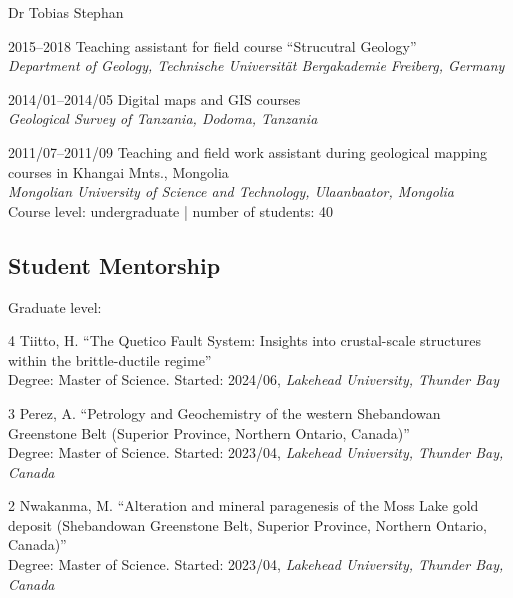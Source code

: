 \documentclass[10pt, paper=letter]{scrartcl} %
\begin{document}
\begin{cv}{\textsf{Dr Tobias Stephan}}
\begin{cvlist}{}
        \item[2015--2018] Teaching assistant for field course \enquote{Strucutral Geology}\\
        \textit{Department of Geology, Technische Universit\"at Bergakademie Freiberg, Germany}
        \item[2014/01--2014/05] Digital maps and GIS courses\\
        \textit{Geological Survey of Tanzania, Dodoma, Tanzania}
        \item[2011/07--2011/09] Teaching and field work assistant during geological mapping courses in Khangai Mnts., Mongolia\\
        \textit{Mongolian University of Science and Technology, Ulaanbaator, Mongolia}\\
        Course level: undergraduate | number of students: 40
    \end{cvlist}

    \subsection{Student Mentorship}
    \begin{cvlist}{Graduate level:}
        \item[4] Tiitto, H. \enquote{The Quetico Fault System: Insights into crustal-scale structures within the brittle-ductile regime}\\
        Degree: Master of Science. Started: 2024/06, \textit{Lakehead University, Thunder Bay}
        \item[3] Perez, A. \enquote{Petrology and Geochemistry of the western
            Shebandowan Greenstone Belt (Superior Province, Northern Ontario, Canada)}\\
        Degree: Master of Science.
        Started: 2023/04, \textit{Lakehead University, Thunder Bay, Canada}
        \item[2] Nwakanma, M. \enquote{Alteration and mineral paragenesis of the Moss Lake gold deposit (Shebandowan Greenstone Belt, Superior Province, Northern Ontario, Canada)}\\
        Degree: Master of Science.
        Started: 2023/04, \textit{Lakehead University, Thunder Bay, Canada}



\end{cvlist}
\end{cv}
\end{document}
